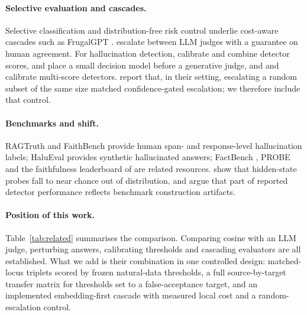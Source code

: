\paragraph{Selective evaluation and cascades.}
Selective classification \citep{geifman2017selective} and distribution-free risk control \citep{angelopoulos2021learn,angelopoulos2022conformal} underlie cost-aware cascades such as FrugalGPT \citep{chen2023frugalgpt}. \citet{jung2025trust} escalate between LLM judges with a guarantee on human agreement. For hallucination detection, \citet{valentin2024cost} calibrate and combine detector scores, \citet{liu2026decision} and \citet{li2026jev} place a small decision model before a generative judge, and \citet{li2026principled} and \citet{goswami2025haltrag} calibrate multi-score detectors. \citet{dorosario2026jev} report that, in their setting, escalating a random subset of the same size matched confidence-gated escalation; we therefore include that control.

\paragraph{Benchmarks and shift.}
RAGTruth \citep{niu2024ragtruth} and FaithBench \citep{bao2025faithbench} provide human span- and response-level hallucination labels; HaluEval \citep{li2023halueval} provides synthetic hallucinated answers; FactBench \citep{bayat2025factbench}, PROBE \citep{zhang2026probe} and the faithfulness leaderboard of \citet{tamber2025benchmarking} are related resources. \citet{dubanowska2025representation} show that hidden-state probes fall to near chance out of distribution, and \citet{hussain2026parallax} argue that part of reported detector performance reflects benchmark construction artifacts.

\paragraph{Position of this work.}
Table~\ref{tab:related} summarises the comparison. Comparing cosine with an LLM judge, perturbing answers, calibrating thresholds and cascading evaluators are all established. What we add is their combination in one controlled design: matched-locus triplets scored by frozen natural-data thresholds, a full source-by-target transfer matrix for thresholds set to a false-acceptance target, and an implemented embedding-first cascade with measured local cost and a random-escalation control.

